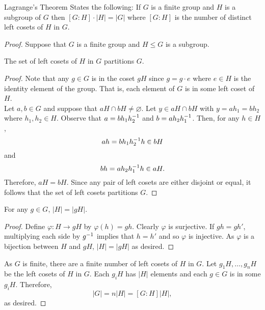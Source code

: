 \documentclass[../../AlgebraQualSolutions.tex]{subfiles}
\begin{document}
	Lagrange's Theorem States the following: If $G$ is a finite group and $H$ is a subgroup of $G$ then $[G:H]\cdot|H| = |G|$ where $[G:H]$ is the number of distinct left cosets of $H$ in $G$.

	\begin{proof}
		Suppose that $G$ is a finite group and $H \leq G$ is a subgroup.

		\begin{claim}
			The set of left cosets of $H$ in $G$ partitions $G$.

			\begin{proof}
				Note that any $g \in G$ is in the coset $gH$ since $g = g\cdot e$ where $e \in H$ is the identity element of the group. That is, each element of $G$ is in some left coset of $H$.\\

				Let $a,b \in G$ and suppose that $aH \cap bH \neq \varnothing$. Let $y \in aH \cap bH$ with $y = ah_1 = bh_2$ where $h_1,h_2 \in H$. Observe that $a = bh_1h_2^{-1}$ and $b = ah_2h_1^{-1}$. Then, for any $h \in H$,
					\[ah = bh_1h_2^{-1} h \in bH \]
				and
					\[bh = ah_2h_1^{-1} h \in aH.\]
				Therefore, $aH = bH$. Since any pair of left cosets are either disjoint or equal, it follows that the set of left cosets partitions $G$.
			\end{proof}
		\end{claim}

		\begin{claim}
			For any $g \in G$, $|H| = |gH|$.

			\begin{proof}
				Define $\varphi: H \to gH$ by $\varphi(h) = gh$. Clearly $\varphi$ is surjective. If $gh = gh'$, multiplying each side by $g^{-1}$ implies that $h = h'$ and so $\varphi$ is injective. As $\varphi$ is a bijection between $H$ and $gH$, $|H| = |gH|$ as desired. 
			\end{proof}
		\end{claim}

		As $G$ is finite, there are a finite number of left cosets of $H$ in $G$. Let $g_1H, \ldots, g_nH$ be the left cosets of $H$ in $G$. Each $g_iH$ has $|H|$ elements and each $g \in G$ is in some $g_iH$. Therefore,
			\[|G| = n|H| = [G:H]|H|,\]
		as desired.
	\end{proof}
\end{document}
